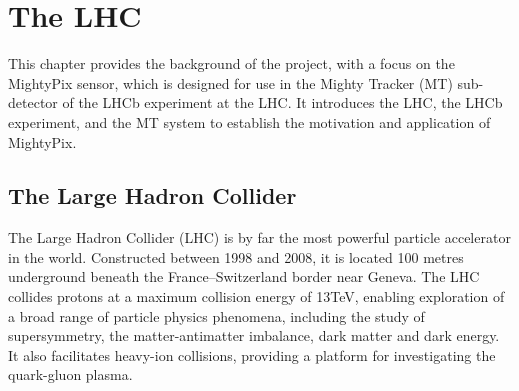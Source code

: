 
\chapter{The LHC}
\graphicspath{{2_Background/Figs/}}

This chapter provides the background of the project, with a focus on the MightyPix sensor, which is designed for use in the Mighty Tracker (MT) sub-detector of the LHCb experiment at the LHC. It introduces the LHC, the LHCb experiment, and the MT system to establish the motivation and application of MightyPix.


\section{The Large Hadron Collider} 
\label{section2.1}
The Large Hadron Collider (LHC) is by far the most powerful particle accelerator in the world\cite{CERNbrochure}. Constructed between 1998 and 2008, it is located 100 metres underground beneath the France–Switzerland border near Geneva. The LHC collides protons at a maximum collision energy of 13TeV, enabling exploration of a broad range of particle physics phenomena, including the study of supersymmetry, the matter-antimatter imbalance, dark matter and dark energy. It also facilitates heavy-ion collisions, providing a platform for investigating the quark-gluon plasma.




